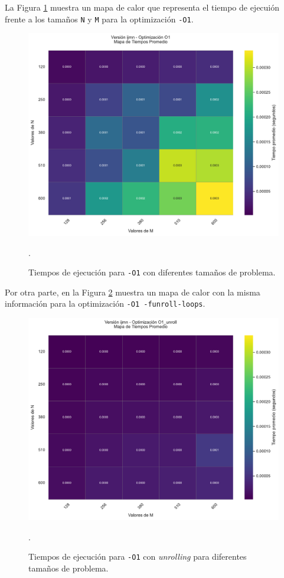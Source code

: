 \documentclass[11pt,a4paper,twoside]{article}
\theoremstyle{definition}
\begin{document}
	La Figura \ref{graf3} muestra un mapa de calor que representa el tiempo de ejecuión frente a los tamaños \texttt{N} y \texttt{M} para la optimización \texttt{-O1}.
	
	\begin{figure} [H] \centering
		\includegraphics[width=.8\textwidth]{../graficas/heatmap_ijmn_O1.pdf}
		\caption{Tiempos de ejecución para \texttt{-O1} con diferentes tamaños de problema.}
		\label{graf3}.
	\end{figure}

	Por otra parte, en la Figura \ref{graf4} muestra un mapa de calor con la misma información para la optimización \texttt{-O1 -funroll-loops}.
	
	\begin{figure} [H] \centering
		\includegraphics[width=.8\textwidth]{../graficas/heatmap_ijmn_O1_unroll.pdf}
		\caption{Tiempos de ejecución para \texttt{-O1} con \textit{unrolling} para diferentes tamaños de problema.}
		\label{graf4}.
	\end{figure}
\end{document}

